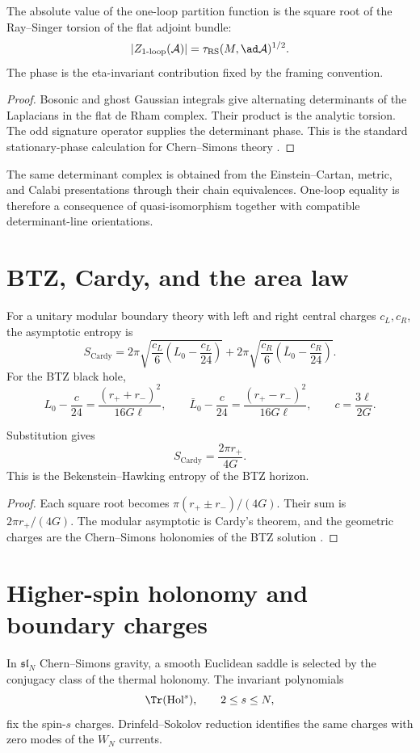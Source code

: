 \begin{theorem}
The absolute value of the one-loop partition function is the square root of the Ray--Singer torsion of the flat adjoint bundle:
\[
 |Z_{1\text{-loop}}(\mathcal A)|
 =\tau_{\mathrm{RS}}(M,\ad\mathcal A)^{1/2}.
\]
The phase is the eta-invariant contribution fixed by the framing convention.
\end{theorem}
\begin{proof}
Bosonic and ghost Gaussian integrals give alternating determinants of the Laplacians in the flat de Rham complex.  Their product is the analytic torsion.  The odd signature operator supplies the determinant phase.  This is the standard stationary-phase calculation for Chern--Simons theory \cite{RaySinger1971,Witten3DGravity}.
\end{proof}

The same determinant complex is obtained from the Einstein--Cartan, metric, and Calabi presentations through their chain equivalences.  One-loop equality is therefore a consequence of quasi-isomorphism together with compatible determinant-line orientations.

\chapter{BTZ, Cardy, and the area law}
For a unitary modular boundary theory with left and right central charges $c_L,c_R$, the asymptotic entropy is
\[
 S_{\mathrm{Cardy}}
 =2\pi\sqrt{\frac{c_L}{6}\left(L_0-\frac{c_L}{24}\right)}
 +2\pi\sqrt{\frac{c_R}{6}\left(\bar L_0-\frac{c_R}{24}\right)}.
\]
For the BTZ black hole,
\[
 L_0-\frac c{24}=\frac{(r_++r_-)^2}{16G\ell},
 \qquad
 \bar L_0-\frac c{24}=\frac{(r_+-r_-)^2}{16G\ell},
 \qquad
 c=\frac{3\ell}{2G}.
\]

\begin{theorem}
Substitution gives
\[
 S_{\mathrm{Cardy}}=\frac{2\pi r_+}{4G}.
\]
This is the Bekenstein--Hawking entropy of the BTZ horizon.
\end{theorem}
\begin{proof}
Each square root becomes $\pi(r_+\pm r_-)/(4G)$.  Their sum is $2\pi r_+/(4G)$.  The modular asymptotic is Cardy's theorem, and the geometric charges are the Chern--Simons holonomies of the BTZ solution \cite{Cardy1986,BTZ1992}.
\end{proof}

\chapter{Higher-spin holonomy and boundary charges}
In $\mathfrak{sl}_N$ Chern--Simons gravity, a smooth Euclidean saddle is selected by the conjugacy class of the thermal holonomy.  The invariant polynomials
\[
 \Tr(\operatorname{Hol}^s),
 \qquad 2\le s\le N,
\]
fix the spin-$s$ charges.  Drinfeld--Sokolov reduction identifies the same charges with zero modes of the $W_N$ currents.

